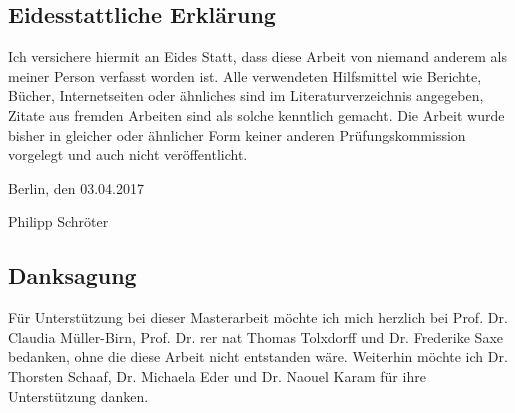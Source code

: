 %
\pagestyle{empty}

\subsection*{Eidesstattliche Erklärung}
Ich versichere hiermit an Eides Statt, dass diese Arbeit von niemand anderem als
meiner Person verfasst worden ist. Alle verwendeten Hilfsmittel wie Berichte,
Bücher, Internetseiten oder ähnliches sind im Literaturverzeichnis angegeben,
Zitate aus fremden Arbeiten sind als solche kenntlich gemacht. Die Arbeit wurde
bisher in gleicher oder ähnlicher Form keiner anderen Prüfungskommission
vorgelegt und auch nicht veröffentlicht.
\par\bigskip  
\noindent Berlin, den 03.04.2017

\vspace{1.2cm}

\noindent Philipp Schröter

\pagebreak[4]

\subsection*{Danksagung}
Für Unterstützung bei dieser Masterarbeit möchte ich mich herzlich bei Prof. Dr.
Claudia Müller-Birn, Prof. Dr. rer nat Thomas Tolxdorff und Dr. Frederike Saxe
bedanken, ohne die diese Arbeit nicht entstanden wäre. Weiterhin möchte ich Dr.
Thorsten Schaaf, Dr. Michaela Eder und Dr. Naouel Karam für ihre Unterstützung
danken.

\cleardoublepage